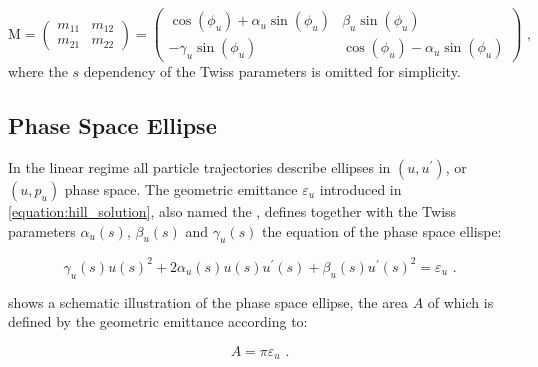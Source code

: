 \begin{equation}
    \mathrm{M} = 
    \left( 
    \begin{array}{ll}
        m_{11} & m_{12} \\
        m_{21} & m_{22}
    \end{array} \right) 
    = 
    \left(
    \begin{array}{cc}
        \cos(\phi_u) + \alpha_u \sin(\phi_u) & \beta_u \sin(\phi_u) \\
        - \gamma_u \sin(\phi_u)              & \cos(\phi_u) - \alpha_u \sin(\phi_u)
    \end{array} 
    \right) \text{ ,}
    \label{equation:transfer_matrix_twiss_parameters}
\end{equation}
where the \(s\) dependency of the Twiss parameters is omitted for simplicity.

\subsection{Phase Space Ellipse}
\label{subsection:phase_space_ellipse}

In the linear regime all particle trajectories describe ellipses in \((u, u^{\prime})\), or \((u, p_u)\) phase space.
The geometric emittance \(\varepsilon_u\) introduced in \cref{equation:hill_solution}, also named the , defines together with the Twiss parameters \(\alpha_u (s)\), \(\beta_u (s)\) and \(\gamma_u (s)\) the equation of the phase space ellispe:

\begin{equation}
    \gamma_{u}(s) u(s)^{2} + 2 \alpha_{u}(s) u(s) u^{\prime}(s) + \beta_{u}(s) u^{\prime}(s)^{2} = \varepsilon_u \text{ .}
    \label{equation:ellipse_equation}
\end{equation}

 shows a schematic illustration of the phase space ellipse, the area \(A\) of which is defined by the geometric emittance according to:

\begin{equation}
    A = \pi \varepsilon_u \text{ .}
    \label{equation:phase_space_ellipse_area}
\end{equation}

